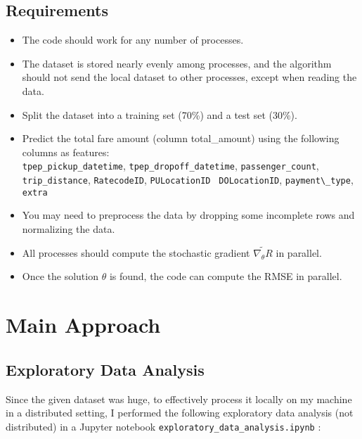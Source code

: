 \documentclass{article}
\begin{document}
\subsection{Requirements}
\begin{itemize}
  \item The code should work for any number of processes.
  \item The dataset is stored nearly evenly among processes, and the algorithm should not send the local dataset to other processes, except when reading the data.
  \item Split the dataset into a training set (70\%) and a test set (30\%).
  \item Predict the total fare amount (column total\_amount) using the following columns as features: \\ \verb|tpep_pickup_datetime|, \verb|tpep_dropoff_datetime|, \verb|passenger_count|, \verb|trip_distance|, \verb|RatecodeID|, \verb|PULocationID|
    \verb| DOLocationID|, \verb |payment\_type|, \verb|extra|
  \item You may need to preprocess the data by dropping some incomplete rows and normalizing the data.

  \item All processes should compute the stochastic gradient $\widetilde{\nabla_{\theta} R}$ in parallel.
  \item Once the solution $\theta$ is found, the code can compute the RMSE in parallel.
\end{itemize}

\newpage
\section{Main Approach}
\subsection{Exploratory Data Analysis}
Since the given dataset was huge, to effectively process it locally on my machine in a distributed setting, I performed the following exploratory data analysis (not distributed) in a Jupyter notebook \verb|exploratory_data_analysis.ipynb| :
\end{document}

